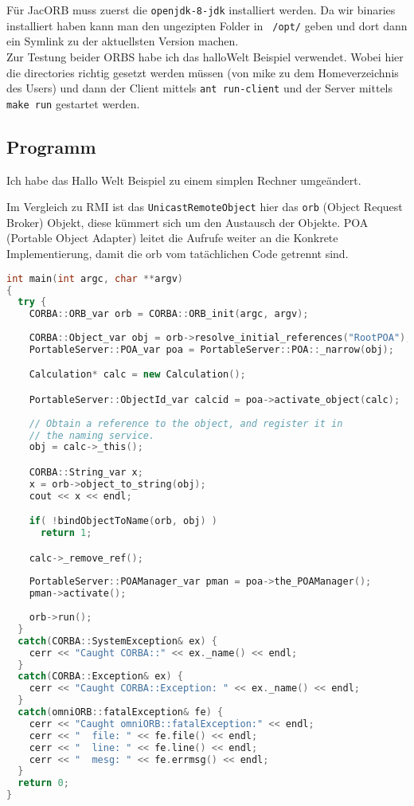 F\"ur JacORB muss zuerst die \texttt{openjdk-8-jdk} installiert werden. Da wir binaries installiert haben kann man den ungezipten Folder in \texttt{~/opt/} geben und dort dann ein Symlink zu der aktuellsten Version machen.\\

Zur Testung beider ORBS habe ich das halloWelt Beispiel \cite{halloWelt-bsp} verwendet. Wobei hier die directories richtig gesetzt werden m\"ussen (von mike zu dem Homeverzeichnis des Users) und dann der Client mittels \texttt{ant run-client} und der Server mittels \texttt{make run} gestartet werden.

\clearpage

\subsection{Programm}

Ich habe das Hallo Welt Beispiel \cite{halloWelt-bsp} zu einem simplen Rechner umge\"andert. 

Im Vergleich zu RMI ist das \texttt{UnicastRemoteObject} hier das \texttt{orb} (Object Request Broker) Objekt, diese k\"ummert sich um den Austausch der Objekte. POA (Portable Object Adapter) leitet die Aufrufe weiter an die Konkrete Implementierung, damit die orb vom tat\"achlichen Code getrennt sind.

\begin{lstlisting}[language=C++, caption=server.cc main Klasse welches die ORB und POA Objekte erstellt]
int main(int argc, char **argv)
{
  try {
    CORBA::ORB_var orb = CORBA::ORB_init(argc, argv);
    
    CORBA::Object_var obj = orb->resolve_initial_references("RootPOA");
    PortableServer::POA_var poa = PortableServer::POA::_narrow(obj);

    Calculation* calc = new Calculation();

    PortableServer::ObjectId_var calcid = poa->activate_object(calc);
    
    // Obtain a reference to the object, and register it in
    // the naming service.
    obj = calc->_this();

    CORBA::String_var x;
    x = orb->object_to_string(obj);
    cout << x << endl;

    if( !bindObjectToName(orb, obj) )
      return 1;

    calc->_remove_ref();
    
    PortableServer::POAManager_var pman = poa->the_POAManager();
    pman->activate();
    
    orb->run();
  }
  catch(CORBA::SystemException& ex) {
    cerr << "Caught CORBA::" << ex._name() << endl;
  }
  catch(CORBA::Exception& ex) {
    cerr << "Caught CORBA::Exception: " << ex._name() << endl;
  }
  catch(omniORB::fatalException& fe) {
    cerr << "Caught omniORB::fatalException:" << endl;
    cerr << "  file: " << fe.file() << endl;
    cerr << "  line: " << fe.line() << endl;
    cerr << "  mesg: " << fe.errmsg() << endl;
  }
  return 0;
}
\end{lstlisting}

